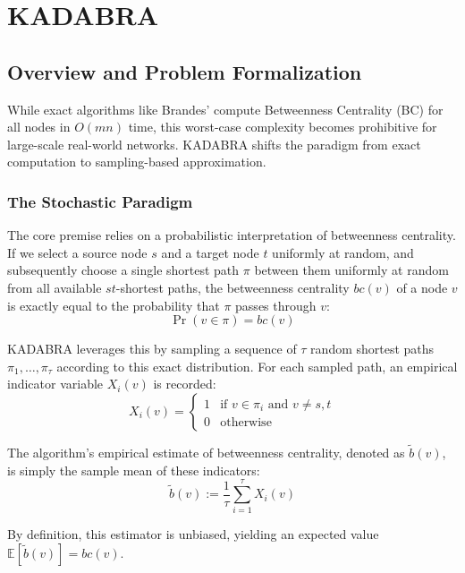 \chapter{KADABRA}
\section{Overview and Problem Formalization}

While exact algorithms like Brandes' compute Betweenness Centrality (BC) for all nodes in $O(mn)$ time, this worst-case complexity becomes prohibitive for large-scale real-world networks. KADABRA shifts the paradigm from exact computation to sampling-based approximation.

\subsection{The Stochastic Paradigm}
The core premise relies on a probabilistic interpretation of betweenness centrality.
 If we select a source node $s$ and a target node $t$ uniformly at random,
  and subsequently choose a single shortest path $\pi$ between them uniformly at random from all available $st$-shortest paths,
   the betweenness centrality $bc(v)$ of a node $v$ is exactly equal to the probability that $\pi$ passes through $v$:
\begin{equation}
    \Pr(v \in \pi) = bc(v)
\end{equation}

KADABRA leverages this by sampling a sequence of $\tau$ random shortest paths $\pi_1, \dots, \pi_\tau$ according to this exact distribution.
 For each sampled path, an empirical indicator variable $X_i(v)$ is recorded:
\begin{equation}
    X_i(v) = \begin{cases} 1 & \text{if } v \in \pi_i \text{ and } v \neq s, t \\ 0 & \text{otherwise} \end{cases}
\end{equation}

The algorithm's empirical estimate of betweenness centrality, denoted as $\tilde{b}(v)$, is simply the sample mean of these indicators:
\begin{equation}
    \tilde{b}(v) := \frac{1}{\tau} \sum_{i=1}^{\tau} X_i(v)
\end{equation}

By definition, this estimator is unbiased, yielding an expected value $\mathbb{E}[\tilde{b}(v)] = bc(v)$.

